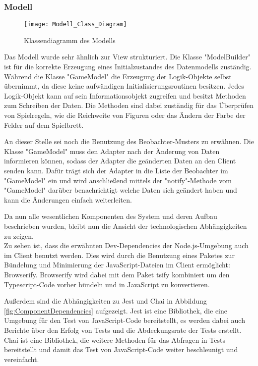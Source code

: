 \subsubsection{Modell}
\begin{figure}[htp]
	\centering
	\captionsetup{justification=centering}
	\texttt{[image: Modell\_Class\_Diagram]}
	\caption[Modell]{Klassendiagramm des Modells}
	\label{fig:ClassesModell}
\end{figure}

\noindent Das Modell wurde sehr ähnlich zur View strukturiert. Die Klasse "ModelBuilder" ist für die korrekte Erzeugung eines Initialzustandes des Datenmodells zuständig. Während die Klasse "GameModel" die Erzeugung der Logik-Objekte selbst übernimmt, da diese keine aufwändigen Initialisierungsroutinen besitzen. Jedes Logik-Objekt kann auf sein Informationsobjekt zugreifen und besitzt Methoden zum Schreiben der Daten. Die Methoden sind dabei zuständig für das Überprüfen von Spielregeln, wie die Reichweite von Figuren oder das Ändern der Farbe der Felder auf dem Spielbrett.

An dieser Stelle sei noch die Benutzung des Beobachter-Musters zu erwähnen. Die Klasse "GameModel" muss den Adapter nach der Änderung von Daten informieren können, sodass der Adapter die geänderten Daten an den Client senden kann. Dafür trägt sich der Adapter in die Liste der Beobachter im "GameModel" ein und wird anschließend mittels der "notify"-Methode vom "GameModel" darüber benachrichtigt welche Daten sich geändert haben und kann die Änderungen einfach weiterleiten.

Da nun alle wesentlichen Komponenten des System und deren Aufbau beschrieben wurden, bleibt nun die Ansicht der technologischen Abhängigkeiten zu zeigen.\\
Zu sehen ist, dass die erwähnten Dev-Dependencies der Node.js-Umgebung auch im Client benutzt werden. Dies wird durch die Benutzung eines Paketes zur Bündelung und Minimierung der JavaScript-Dateien im Client ermöglicht: Browserify. Browserify wird dabei mit dem Paket tsify kombiniert um den Typescript-Code vorher bündeln und in JavaScript zu konvertieren.

Außerdem sind die Abhängigkeiten zu Jest und Chai in Abbildung \ref{fig:ComponentDependencies} aufgezeigt. Jest ist eine Bibliothek, die eine Umgebung für den Test von JavaScript-Code bereitstellt, es werden dabei auch Berichte über den Erfolg von Tests und die Abdeckungsrate der Tests erstellt. Chai ist eine Bibliothek, die weitere Methoden für das Abfragen in Tests bereitstellt und damit das Test von JavaScript-Code weiter beschleunigt und vereinfacht.

